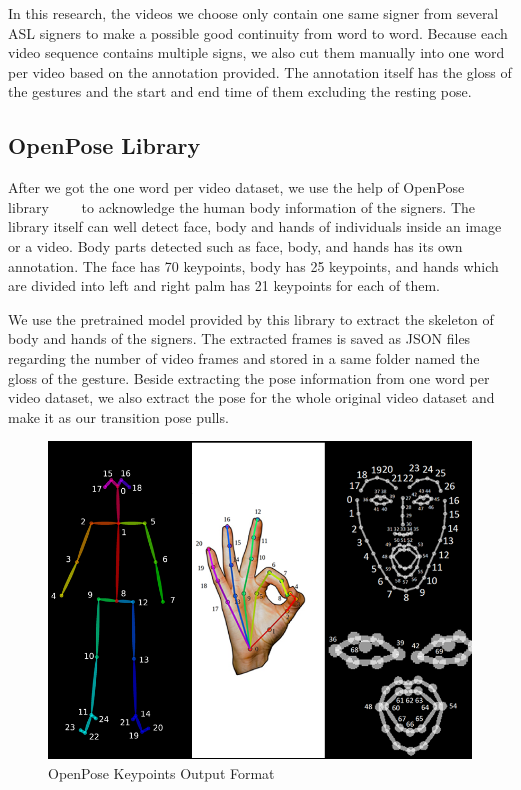 \documentclass{sig-alternate-05-2015}
\begin{document}
In this research, the videos we choose only contain one same signer from several ASL signers to make a possible good continuity from word to word. Because each video sequence contains multiple signs, we also cut them manually into one word per video based on the annotation provided. The annotation itself has the gloss of  the gestures and the start and end time of them excluding the resting pose.

\subsection{OpenPose Library}
After we got the one word per video dataset, we use the help of OpenPose library~\cite{openpose1}~\cite{openpose2}~\cite{openpose3}~\cite{openpose4} to acknowledge the human body information of the signers. The library itself can well detect face, body and hands of individuals inside an image or a video. Body parts detected such as face, body, and hands has its own annotation. The face has 70 keypoints, body has 25 keypoints, and hands which are divided into left and right palm has 21 keypoints for each of them.

We use the pretrained model provided by this library to extract the skeleton of body and hands of the signers. The extracted frames is saved as JSON files regarding the number of video frames and stored in a same folder named the gloss of the gesture. Beside extracting the pose information from one word per video dataset, we also extract the pose for the whole original video dataset and make it as our transition pose pulls. 

\begin{figure}
	\centering
	\includegraphics[width=\linewidth]{img/openpose.png}
	\caption{OpenPose Keypoints Output Format}
\end{figure}
\end{document}
